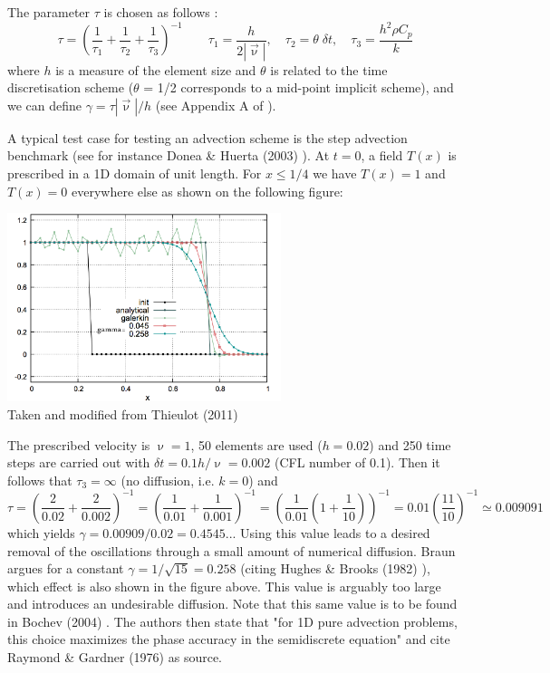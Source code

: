 The parameter $\tau$ is chosen as follows \cite{teos00}:
\begin{equation}
\tau= \left(\frac{1}{\tau_1} + \frac{1}{\tau_2} + \frac{1}{\tau_3} \right)^{-1}
\qquad
\tau_1=\frac{h}{2 |\vec\upnu|},
\quad
\tau_2 = \theta \; \delta t,
\quad
\tau_3 = \frac{h^2 \rho C_p}{k}
\label{tausupg}
\end{equation}
where $h$ is a measure of the element size and $\theta$ is related to the time
discretisation scheme ($\theta$ = 1/2 corresponds to a mid-point implicit scheme),
and we can define $\gamma=\tau |\vec\upnu|/h$ (see Appendix A of \cite{thie11}). 

A typical test case for testing an advection scheme is the step advection benchmark 
(see for instance Donea \& Huerta (2003) \cite{dohu03}). At $t=0$, 
a field $T(x)$ is prescribed in a 1D domain of unit length. For $x\le 1/4$ we have $T(x)=1$ and 
$T(x)=0$ everywhere else as shown on the following figure:
\begin{center}
\includegraphics[width=8cm]{images/supg/fantom3}\\
{\captionfont Taken and modified from Thieulot (2011) \cite{thie11}}
\end{center}
The prescribed velocity is $\upnu=1$, 50 elements are used ($h=0.02$) and 250 time steps are 
carried out with $\delta t=0.1h/\upnu=0.002$ (CFL number of 0.1).
Then it follows that $\tau_3=\infty$ (no diffusion, i.e. $k=0$) and 
\[
\tau
= \left(\frac{2}{0.02} + \frac{2}{0.002} \right)^{-1}
= \left(\frac{1}{0.01} + \frac{1}{0.001} \right)^{-1}
= \left(\frac{1}{0.01} (1 + \frac{1}{10})  \right)^{-1}
= 0.01 \left(\frac{11}{10}  \right)^{-1}
\simeq 0.009091
\]
which yields $\gamma = 0.00909/0.02=0.4545...$
Using this value leads to a desired removal of the oscillations through a small
amount of numerical diffusion. Braun \cite{brau03} argues for a constant
$\gamma=1/\sqrt{15}=0.258$ (citing Hughes \& Brooks (1982) \cite{hubr82}), 
which effect is also shown in the figure above. This 
value is arguably too large and introduces an undesirable diffusion. Note that this same value is 
to be found in Bochev \etal (2004) \cite{bogs04}. The authors then state that 
"for 1D pure advection problems, this choice maximizes the phase accuracy in the semidiscrete
equation" and cite Raymond \& Gardner (1976) \cite{raga76} as source. 

